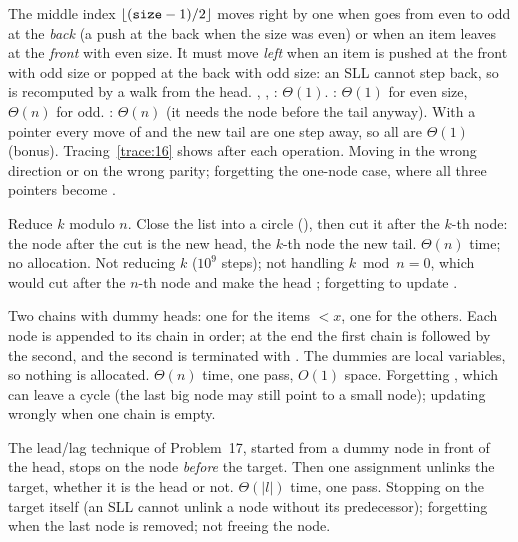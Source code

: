 \idea The middle index $\lfloor(\texttt{size}-1)/2\rfloor$ moves right by one when 
goes from even to odd at the \emph{back} (a push at the back when the size was even) or
when an item leaves at the \emph{front} with even size. It must move \emph{left} when an
item is pushed at the front with odd size or popped at the back with odd size: an SLL
cannot step back, so  is recomputed by a walk from the head.
\complexity {}, , : $\Theta(1)$. :
$\Theta(1)$ for even size, $\Theta(n)$ for odd. : $\Theta(n)$ (it needs the
node before the tail anyway). With a  pointer every move of  and the
new tail are one step away, so all are $\Theta(1)$ (bonus). Tracing~\ref{trace:16} shows
 after each operation.
\mistakes Moving  in the wrong direction or on the wrong parity; forgetting the
one-node case, where all three pointers become .

\idea Reduce $k$ modulo $n$. Close the list into a circle (), then
cut it after the $k$-th node: the node after the cut is the new head, the $k$-th node the
new tail.
\complexity $\Theta(n)$ time; no allocation.
\mistakes Not reducing $k$ ($10^9$ steps); not handling $k\bmod n=0$, which would cut
after the $n$-th node and make the head ; forgetting to update .

\idea Two chains with dummy heads: one for the items $<x$, one for the others. Each node
is appended to its chain in order; at the end the first chain is followed by the second,
and the second is terminated with . The dummies are local  variables,
so nothing is allocated.
\complexity $\Theta(n)$ time, one pass, $O(1)$ space.
\mistakes Forgetting , which can leave a cycle (the last big node may
still point to a small node); updating  wrongly when one chain is empty.

\idea The lead/lag technique of Problem~17, started from a dummy node in front of the
head, stops  on the node \emph{before} the target. Then one assignment unlinks
the target, whether it is the head or not.
\complexity $\Theta(|l|)$ time, one pass.
\mistakes Stopping  on the target itself (an SLL cannot unlink a node without its
predecessor); forgetting  when the last node is removed; not freeing the node.

